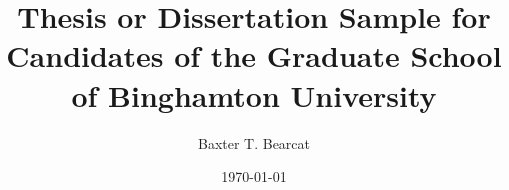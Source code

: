 \documentclass[12pt,oneside]{book}
\title{Thesis or Dissertation Sample for Candidates of the Graduate School of Binghamton University}
\author{Baxter T. Bearcat}
\date{\today}
\begin{document}
\frontmatter







\tableofcontents
\listoftables
\listoffigures

\mainmatter

\begin{doublespacing}
    
    
    
\end{doublespacing}

\appendix


\backmatter


\raggedright
\printbibliography[heading=bibintoc]
\end{document}
